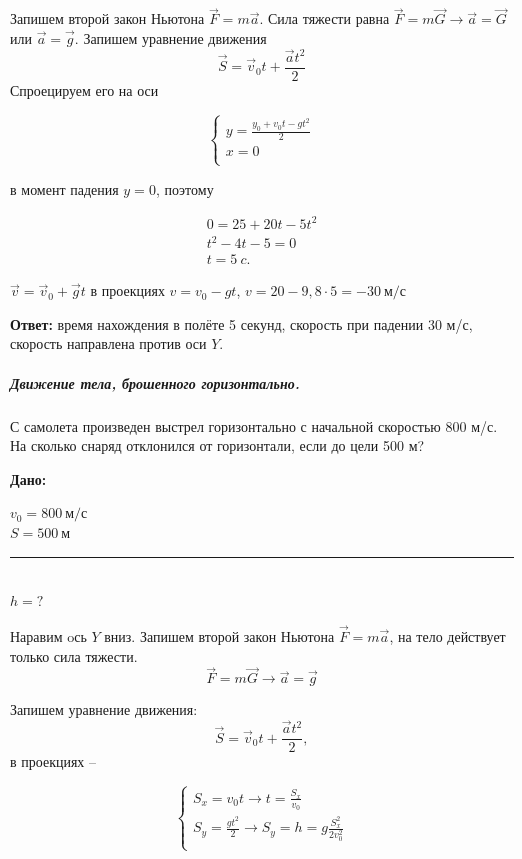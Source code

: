 \documentclass[a6paper, 11pt]{diss_4}
\newcommand{\TNF}{$\vec{F}=m\vec{a}$}
\renewcommand{\'}{\,'}
\newcommand{\UDV}{\vec{S}=\vec{v}_0t+\frac{\vec{a}t^2}{2}}
\begin{document}
Запишем второй закон Ньютона \TNF.
Сила тяжести равна $\vec{F}=m\vec{G}\to\vec{a}=\vec{G}$ или $\vec{a}=\vec{g}$.  Запишем уравнение движения
\[
\UDV
\]
 Спроецируем его на оси

\begin{equation*}
     \left\{
          \begin{array}{lr}
 y=\frac{y_0+v_0t-gt^2}{2}\\
 x=0\\
          \end{array}
     \right.
\end{equation*}

в момент падения $y=0$, поэтому

\begin{gather*}
0=25+20t-5t^2\\
t^2-4t-5=0\\
t=5\ c.
\end{gather*}

$\vec{v}=\vec{v}_0+\vec{g}t$ в проекциях $v=v_0-gt$, $v=20-9,8\cdot5=-30\ м/с$

\textbf{Ответ:} время нахождения в полёте 5 секунд, скорость при падении 30 м/с, скорость направлена против оси $Y$.

\subparagraph*{Движение тела, брошенного горизонтально.}

С самолета произведен выстрел горизонтально с начальной скоростью 800 м/с. На сколько снаряд отклонился от горизонтали, если до цели 500 м?

\hspace{1cm}\textbf{Дано:}\hspace{.3cm}
\parbox[t]{4cm}{
$v_0 = 800\ м/с$\\
$S=500\ м$\\
\rule{4cm}{.4pt}\\
$h = ?$\\
}

Наравим oсь $Y$ вниз. Запишем второй закон Ньютона \TNF, на тело действует только сила тяжести.
\[
\vec{F}=m\vec{G}\to\vec{a}=\vec{g}
\]

Запишем уравнение движения:
\[
\UDV,
\]
в проекциях --

\begin{equation*}
     \left\{
          \begin{array}{lr}
 S_x=v_0t\to t=\frac{S_x}{v_0}\\
 S_y=\frac{gt^2}{2}\to S_y=h=g\frac{S_x^2}{2v_0^2}\\
          \end{array}
     \right.
\end{equation*}
\end{document}
